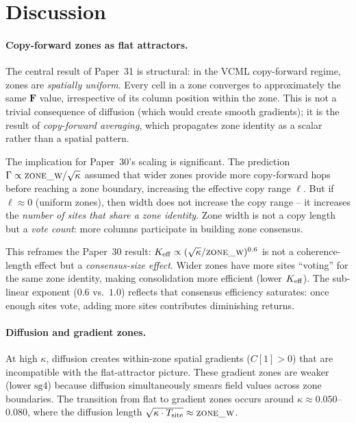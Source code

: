 \documentclass[11pt,a4paper]{article}
\begin{document}
\section{Discussion}
\label{sec:discussion}

\paragraph{Copy-forward zones as flat attractors.}
The central result of Paper~31 is structural: in the VCML copy-forward regime, zones are
\emph{spatially uniform}.  Every cell in a zone converges to approximately the same
$\mathbf{F}$ value, irrespective of its column position within the zone.  This is not a
trivial consequence of diffusion (which would create smooth gradients); it is the result of
\emph{copy-forward averaging}, which propagates zone identity as a scalar rather than a
spatial pattern.

The implication for Paper~30's scaling is significant.  The prediction $\Gamma \propto
\textsc{zone\_w}/\sqrt{\kappa}$ assumed that wider zones provide more copy-forward hops
before reaching a zone boundary, increasing the effective copy range $\ell$.  But if
$\ell \approx 0$ (uniform zones), then width does not increase the copy range -- it
increases the \emph{number of sites that share a zone identity}.  Zone width is not a
copy length but a \emph{vote count}: more columns participate in building zone consensus.

This reframes the Paper~30 result: $K_{\rm eff} \propto (\sqrt{\kappa}/
\textsc{zone\_w})^{0.6}$ is not a coherence-length effect but a \emph{consensus-size
effect}.  Wider zones have more sites ``voting'' for the same zone identity, making
consolidation more efficient (lower $K_{\rm eff}$).  The sub-linear exponent ($0.6$
vs.\ $1.0$) reflects that consensus efficiency saturates: once enough sites vote, adding
more sites contributes diminishing returns.

\paragraph{Diffusion and gradient zones.}
At high $\kappa$, diffusion creates within-zone spatial gradients ($C[1] > 0$) that are
incompatible with the flat-attractor picture.  These gradient zones are weaker (lower
$\mathrm{sg4}$) because diffusion simultaneously smears field values across zone
boundaries.  The transition from flat to gradient zones occurs around $\kappa \approx
0.050$--$0.080$, where the diffusion length $\sqrt{\kappa \cdot T_{\rm site}} \approx
\textsc{zone\_w}$.
\end{document}
